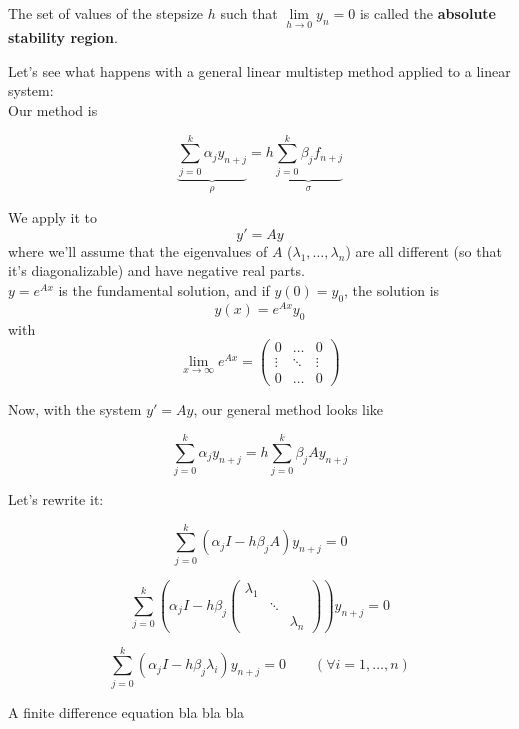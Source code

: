 \begin{definition}
  The set of values of the stepsize $h$ such that $\lim\limits_{h\to0}y_n = 0$ is called the \textbf{absolute stability region}.
\end{definition}

Let's see what happens with a general linear multistep method applied to a linear system:\\

Our method is

\[
  \underbrace{\sum_{j=0}^k\alpha_jy_{n+j}}_{\rho} = h\underbrace{\sum_{j=0}^k\beta_jf_{n+j}}_{\sigma}
\]

We apply it to $$y' = Ay$$ where we'll assume that the eigenvalues of $A$ ($\lambda_1, \ldots, \lambda_n$) are all different (so that it's diagonalizable) and have negative real parts. \\

$y = e^{Ax}$ is the fundamental solution, and if $y(0) = y_0$, the solution is $$y(x) = e^{Ax}y_0$$ with $$\lim_{x\to\infty}e^{Ax} = \begin{pmatrix}
                                               0      & \ldots & 0      \\
                                               \vdots & \ddots & \vdots \\
                                               0      & \ldots & 0
                                             \end{pmatrix}$$

Now, with the system $y' = Ay$, our general method looks like

\[
  \sum_{j=0}^k\alpha_jy_{n+j} = h\sum_{j=0}^k\beta_jAy_{n+j}
\]

Let's rewrite it:

$$\sum_{j=0}^k(\alpha_jI-h\beta_jA)y_{n+j} = 0$$
\begin{center}
\end{center}
$$\sum_{j=0}^k\left(\alpha_jI-h\beta_j\begin{pmatrix}\lambda_1 & & \\ & \ddots & \\ & & \lambda_n \end{pmatrix}\right)y_{n+j} = 0$$
\begin{center}
\end{center}
$$\sum_{j=0}^k(\alpha_jI-h\beta_j\lambda_i)y_{n+j} = 0 \qquad (\forall i = 1,\ldots,n)$$

\newpage

A finite difference equation bla bla bla
